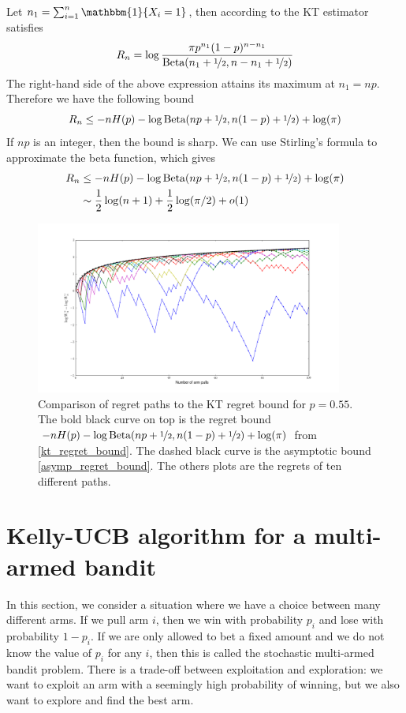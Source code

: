 \documentclass[letterpaper]{article}
\numberwithin{equation}{section}
\theoremstyle{plain}
\begin{document}
Let $n_1 = \sum_{i=1}^n \mathbbm{1}\{X_i=1\}$, then according to \cite{cesa2006prediction} the KT estimator satisfies
\begin{equation}
R_n = \log\frac{\pi p^{n_1}(1-p)^{n-n_1}}{\text{Beta}(n_1+\nicefrac{1}{2}, n-n_1 + \nicefrac{1}{2})}
\end{equation}
The right-hand side of the above expression attains its maximum at $n_1 = np$. Therefore we have the following bound
\begin{equation}
R_n \le -nH(p) -\log \text{Beta}(np+\nicefrac{1}{2}, n(1-p)+\nicefrac{1}{2}) + \log(\pi)
\end{equation}
If $np$ is an integer, then the bound is sharp. We can use Stirling's formula to approximate the beta function, which gives
\begin{align}\label{kt_regret_bound}
R_n &\le -nH(p) -\log \text{Beta}(np+\nicefrac{1}{2}, n(1-p)+\nicefrac{1}{2}) + \log(\pi)\\
&\sim \frac{1}{2}\log(n+1) + \frac{1}{2}\log(\pi/2) + o(1)\label{asymp_regret_bound}
\end{align}

\begin{figure}[ht]
\centering
\includegraphics[width=0.9\textwidth]{single_arm_kt_regret.png}
\caption{Comparison of regret paths to the KT regret bound for $p=0.55$. The bold black curve on top is the regret bound $-nH(p) -\log \text{Beta}(np+\nicefrac{1}{2}, n(1-p)+\nicefrac{1}{2}) + \log(\pi)$ from \eqref{kt_regret_bound}. The dashed black curve is the asymptotic bound \eqref{asymp_regret_bound}. The others plots are the regrets of ten different paths.}
\label{single_arm_regret_figure}
\end{figure}

\section{Kelly-UCB algorithm for a multi-armed bandit}\label{mab}
In this section, we consider a situation where we have a choice between many different arms. If we pull arm $i$, then we win with probability $p_i$ and lose with probability $1-p_i$. If we are only allowed to bet a fixed amount and we do not know the value of $p_i$ for any $i$, then this is called the stochastic multi-armed bandit problem. There is a trade-off between exploitation and exploration: we want to exploit an arm with a seemingly high probability of winning, but we also want to explore and find the best arm.
\end{document}
